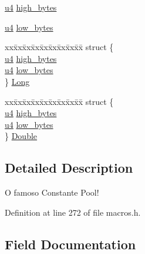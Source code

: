 \begin{DoxyCompactItemize}
\begin{tabbing}
\end{tabbing}\item 
\hyperlink{macros_8h_a4af10c3137cf79c12265e8d288070711}{u4} \hyperlink{structcp__info_ac9717d5a233a28a073c738d75f2585af}{high\+\_\+bytes}
\item 
\hyperlink{macros_8h_a4af10c3137cf79c12265e8d288070711}{u4} \hyperlink{structcp__info_aa98182719e334000a87d75af9d288ff7}{low\+\_\+bytes}
\item 
\begin{tabbing}
xx\=xx\=xx\=xx\=xx\=xx\=xx\=xx\=xx\=\kill
struct \{\\
\>\hyperlink{macros_8h_a4af10c3137cf79c12265e8d288070711}{u4} \hyperlink{structcp__info_ac9717d5a233a28a073c738d75f2585af}{high\_bytes}\\
\>\hyperlink{macros_8h_a4af10c3137cf79c12265e8d288070711}{u4} \hyperlink{structcp__info_aa98182719e334000a87d75af9d288ff7}{low\_bytes}\\
\} \hyperlink{structcp__info_ae0880f47092712d46f2ba910a15515d0}{Long}\\

\end{tabbing}\item 
\begin{tabbing}
xx\=xx\=xx\=xx\=xx\=xx\=xx\=xx\=xx\=\kill
struct \{\\
\>\hyperlink{macros_8h_a4af10c3137cf79c12265e8d288070711}{u4} \hyperlink{structcp__info_ac9717d5a233a28a073c738d75f2585af}{high\_bytes}\\
\>\hyperlink{macros_8h_a4af10c3137cf79c12265e8d288070711}{u4} \hyperlink{structcp__info_aa98182719e334000a87d75af9d288ff7}{low\_bytes}\\
\} \hyperlink{structcp__info_a64d820fa5a0167ae27047a5eabbe4cae}{Double}\\

\end{tabbing}\end{DoxyCompactItemize}


\subsection{Detailed Description}
O famoso Constante Pool! 

Definition at line 272 of file macros.\+h.



\subsection{Field Documentation}
\hypertarget{structcp__info_ac6ab0ef16fce28e02466e662e10f4acc}{}
